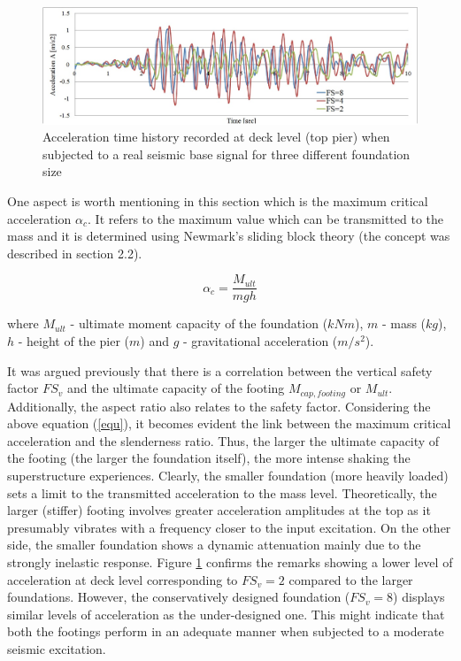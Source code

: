  \begin{figure}[!h]
 	\centering
 	\includegraphics[width=0.9\linewidth]{"acc_2,4,8"}
 	\caption{Acceleration time history recorded at deck level (top pier) when subjected to a real seismic base signal for three different foundation size}
 	\label{eq3}
 \end{figure}

One aspect is worth mentioning in this section which is the maximum critical acceleration $\alpha_c$. It refers to the maximum value which can be transmitted to the mass and it is determined using Newmark's sliding block theory (the concept was described in section 2.2).

\begin{equation}
	\alpha_c=\frac{M_{ult}}{mgh}
	\label{equ}
\end{equation}

where $M_{ult}$ - ultimate moment capacity of the foundation ($kNm$), $m$ - mass ($kg$), $h$ - height of the pier ($m$) and $g$ - gravitational acceleration ($m/s^2$).

It was argued previously that there is a correlation between the vertical safety factor $FS_v$ and the ultimate capacity of the footing $M_{cap, footing}$ or $M_{ult}$. Additionally, the aspect ratio also relates to the safety factor. Considering the above equation (\ref{equ}), it becomes evident the link between the maximum critical acceleration and the slenderness ratio. Thus, the larger the ultimate capacity of the footing (the larger the foundation itself), the more intense shaking the superstructure experiences. Clearly, the smaller foundation (more heavily loaded) sets a limit to the transmitted acceleration to the mass level. Theoretically, the larger (stiffer) footing involves greater acceleration amplitudes at the top as it presumably vibrates with a frequency closer to the input excitation. On the other side, the smaller foundation shows a dynamic attenuation mainly due to the strongly inelastic response.
Figure \ref{eq3} confirms the remarks showing a lower level of acceleration at deck level corresponding to $FS_v=2$ compared to the larger foundations. However, the conservatively designed foundation ($FS_v=8$) displays similar levels of acceleration as the under-designed one. This might indicate that both the footings perform in an adequate manner when subjected to a moderate seismic excitation. 

